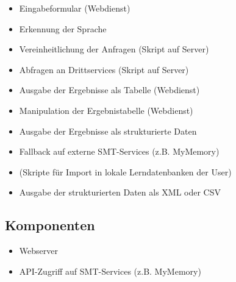 \documentclass[a4paper]{article}
\begin{document}
\begin{itemize}
	\item Eingabeformular (Webdienst)
	\item Erkennung der Sprache
	\item Vereinheitlichung der Anfragen (Skript auf Server)
	\item Abfragen an Drittservices (Skript auf Server)
	\item Ausgabe der Ergebnisse als Tabelle (Webdienst)
	\item Manipulation der Ergebnistabelle (Webdienst)
	\item Ausgabe der Ergebnisse als strukturierte Daten
	\item Fallback auf externe SMT-Services (z.B. MyMemory)
	\item (Skripte für Import in lokale Lerndatenbanken der User)
	\item Ausgabe der strukturierten Daten als XML oder CSV
\end{itemize}

\subsection{Komponenten}

\begin{itemize}
	\item Webserver
	\item API-Zugriff auf SMT-Services (z.B. MyMemory)
\end{itemize}
\end{document}
